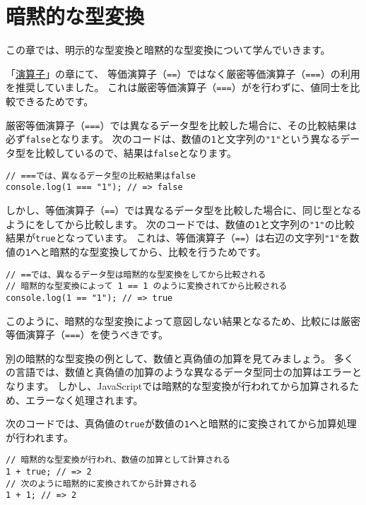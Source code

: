 \hypertarget{implicit-coercion}{%
\chapter{暗黙的な型変換}\label{implicit-coercion}}
\thispagestyle{frontheadings}

この章では、明示的な型変換と暗黙的な型変換について学んでいきます。

「\hyperlink{operator}{演算子}」の章にて、
等価演算子（\texttt{==}）ではなく厳密等価演算子（\texttt{===}）の利用を推奨していました。
これは厳密等価演算子（\texttt{===}）が\textbf{}を行わずに、値同士を比較できるためです。

厳密等価演算子（\texttt{===}）では異なるデータ型を比較した場合に、その比較結果は必ず\texttt{false}となります。
次のコードは、数値の\texttt{1}と文字列の\texttt{"1"}という異なるデータ型を比較しているので、結果は\texttt{false}となります。

\begin{lstlisting}
// ===では、異なるデータ型の比較結果はfalse
console.log(1 === "1"); // => false
\end{lstlisting}

しかし、等価演算子（\texttt{==}）では異なるデータ型を比較した場合に、同じ型となるように\textbf{}をしてから比較します。
次のコードでは、数値の\texttt{1}と文字列の\texttt{"1"}の比較結果が\texttt{true}となっています。
これは、等価演算子（\texttt{==}）は右辺の文字列\texttt{"1"}を数値の\texttt{1}へと暗黙的な型変換してから、比較を行うためです。

\begin{lstlisting}
// ==では、異なるデータ型は暗黙的な型変換をしてから比較される
// 暗黙的な型変換によって 1 == 1 のように変換されてから比較される
console.log(1 == "1"); // => true
\end{lstlisting}

このように、暗黙的な型変換によって意図しない結果となるため、比較には厳密等価演算子（\texttt{===}）を使うべきです。

別の暗黙的な型変換の例として、数値と真偽値の加算を見てみましょう。
多くの言語では、数値と真偽値の加算のような異なるデータ型同士の加算はエラーとなります。
しかし、JavaScriptでは暗黙的な型変換が行われてから加算されるため、エラーなく処理されます。

次のコードでは、真偽値の\texttt{true}が数値の\texttt{1}へと暗黙的に変換されてから加算処理が行われます。

\begin{lstlisting}
// 暗黙的な型変換が行われ、数値の加算として計算される
1 + true; // => 2
// 次のように暗黙的に変換されてから計算される
1 + 1; // => 2
\end{lstlisting}

